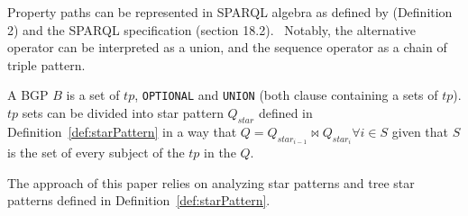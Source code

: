 Property paths can be represented in SPARQL algebra as defined by \citeauthor{Kostylev2015} (Definition 2) and the SPARQL specification (section 18.2).~
Notably, the alternative operator can be interpreted as a union, and the sequence operator as a chain of triple pattern.

\begin{definition}[BGP]\label{def:bgp}
 A BGP $B$ is a set of $tp$, \texttt{OPTIONAL} and \texttt{UNION} (both clause containing a sets of $tp$).
 $tp$ sets can be divided into star pattern $Q_{star}$ defined in Definition~\ref{def:starPattern} in a way 
 that $Q = Q_{star_{i-1}} \bowtie Q_{star_i} \forall i \in S$ given that $S$ is the set of every subject of the $tp$ in the $Q$.
\end{definition}
\fi

The approach of this paper relies on analyzing star patterns and tree star patterns defined in Definition~\ref{def:starPattern}.

